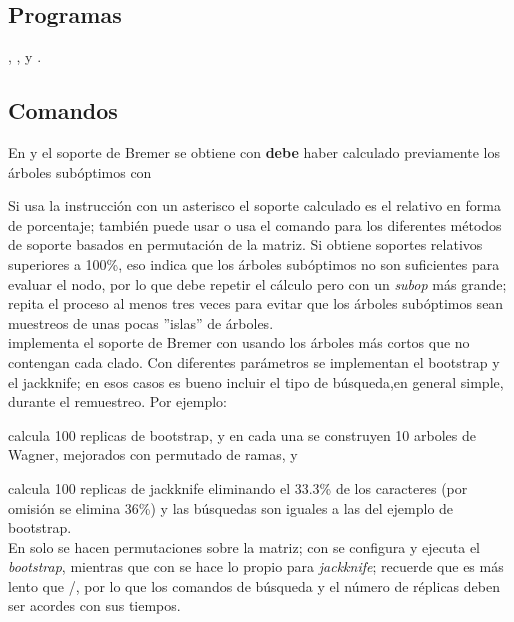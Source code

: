 \subsection{Programas}
\noindent
{}, ,  y .
\subsection{Comandos}
En  y  el soporte de Bremer se obtiene con 
\textbf{debe} haber calculado previamente los \'arboles  sub\'optimos con  


Si usa la instrucci\'on con un asterisco 
el soporte calculado es el relativo en forma de porcentaje; tambi\'en puede usar \Cmd{bsupport [;} o \Cmd{bsupport ];}
 usa el comando  para los diferentes m\'etodos de soporte basados en permutaci\'on de la matriz. Si obtiene soportes relativos superiores a 100\%, eso indica que los \'arboles sub\'optimos no son suficientes para evaluar el nodo, por lo que debe repetir el c\'alculo pero con un \emph{subop} m\'as grande; repita el proceso al menos tres veces para evitar que los \'arboles sub\'optimos sean muestreos de unas pocas ''islas'' de \'arboles.\\
 implementa el soporte de Bremer con 
usando los \'arboles m\'as cortos que no contengan cada clado. Con diferentes par\'ametros se implementan el bootstrap y el jackknife; en esos casos es bueno incluir el tipo de b\'usqueda,en general simple, durante el remuestreo. 
Por ejemplo: 


calcula 100 replicas de bootstrap, y en cada una se construyen 10 arboles de Wagner, mejorados con permutado de ramas, y 


calcula 100 replicas de jackknife eliminando el 33.3\% de los caracteres (por omisi\'on se elimina 36\%) y las b\'usquedas son iguales a las del ejemplo de bootstrap.\\
En  solo se hacen permutaciones sobre la matriz; con  se configura y ejecuta el \textit{bootstrap}, mientras que con   se hace lo propio para \textit{jackknife}; recuerde que  es 
m\'as lento que /, por lo que los comandos de b\'usqueda y el n\'umero de r\'eplicas deben ser acordes con sus tiempos.

